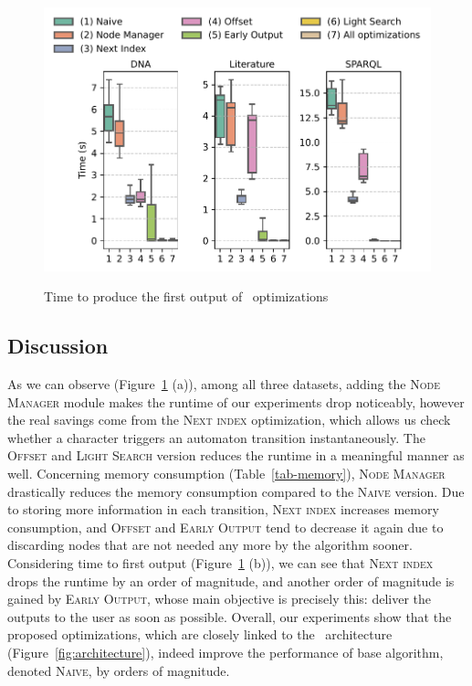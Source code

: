 \begin{figure}[t]
	\centering
	\includegraphics[width=.8\textwidth]{figures/versions-fot.pdf}
	\label{fig:opt-firstOT}
	\caption{Time to produce the first output of \rematch\ optimizations}
	\label{fig-optimizations}
\end{figure}




\subsection{Discussion}
As we can observe (Figure~\ref{fig-optimizations} (a)), among all three datasets, adding the \textsc{Node Manager} module makes the runtime of our experiments drop noticeably, however the real savings come from the \textsc{Next index} optimization, which allows us check whether a character triggers an automaton transition instantaneously. The \textsc{Offset} and \textsc{Light Search} version reduces the runtime in a meaningful manner as well. Concerning memory consumption (Table~\ref{tab-memory}), \textsc{Node Manager} drastically reduces the memory consumption compared to the \textsc{Naive} version. Due to storing more information in each transition, \textsc{Next index} increases memory consumption, and \textsc{Offset} and \textsc{Early Output} tend to decrease it again due to discarding nodes that are not needed any more by the algorithm sooner. Considering time to first output (Figure~\ref{fig-optimizations} (b)), we can see that \textsc{Next index} drops the runtime by an order of magnitude, and another order of magnitude is gained by \textsc{Early Output}, whose main objective is precisely this: deliver the outputs to the user as soon as possible. Overall, our experiments show that the proposed optimizations, which are closely linked to the \rematch\ architecture (Figure~\ref{fig:architecture}), indeed improve the performance of base algorithm, denoted \textsc{Naive}, by orders of magnitude.


